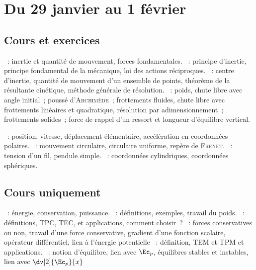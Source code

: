 \documentclass[a4paper, 12pt, final, garamond]{book}
\begin{document}
\setcounter{chapter}{15}

\chapter{Du 29 janvier au 1\ier{} février}

\section{Cours et exercices}
\begin{enumerate}[label=\Roman*]
	~: inertie et quantité de mouvement, forces
	fondamentales.
	~: principe d'inertie, principe
	fondamental de la mécanique, loi des actions réciproques.
	~: centre d'inertie, quantité de mouvement
	d'un ensemble de points, théorème de la résultante cinétique, méthode
	générale de résolution.
	~: poids, chute libre avec angle initial~; poussé
	d'\textsc{Archimède}~; frottements fluides, chute libre avec frottements
	linéaires et quadratique, résolution par adimensionnement~; frottements
	solides~; force de rappel d'un ressort et longueur d'équilibre vertical.
\end{enumerate}

\begin{enumerate}[label=\Roman*]
	~: position, vitesse,
	déplacement élémentaire, accélération en coordonnées polaires.
	~: mouvement circulaire,
	circulaire uniforme, repère de \textsc{Frenet}.
	~: tension d'un fil, pendule simple.
	~: coordonnées cylindriques,
	coordonnées sphériques.
\end{enumerate}

\section{Cours uniquement}
\begin{enumerate}[label=\Roman*]
	~: énergie, conservation, puissance.
	~: définitions,
	exemples, travail du poids.
	~: définitions, TPC,
	TEC, et applications, comment choisir~?
	~: forces conservatives ou
	non, travail d'une force conservative, gradient d'une fonction scalaire,
	opérateur différentiel, lien à l'énergie potentielle
	~: définition, TEM et TPM et applications.
	~: notion d'équilibre, lien
	avec $\Ec_p$, équilibres stables et instables, lien avec
	$\dv[2]{\Ec_p}{x}$
\end{enumerate}
\end{document}
